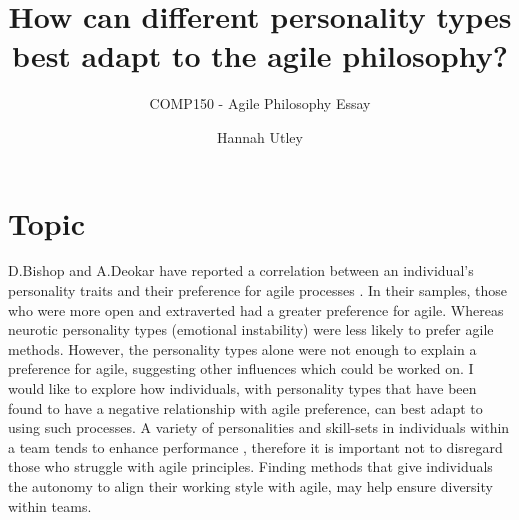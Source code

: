 \documentclass{scrartcl}
\title{How can different personality types best adapt to the agile philosophy?}
\subtitle{COMP150 - Agile Philosophy Essay}
\author{Hannah Utley}
\begin{document}
\maketitle

\section*{Topic}

D.Bishop and A.Deokar have reported a correlation between an individual’s personality traits and their preference for agile processes 
\cite{Paper1}. In their samples, those who were more open and extraverted had a greater preference for agile. Whereas neurotic 
personality types (emotional instability) were less likely to prefer agile methods. However, the personality types alone were not enough 
to explain a preference for agile, suggesting other influences which could be worked on. I would like to explore how individuals, with 
personality types that have been found to have a negative relationship with agile preference, can best adapt to using such processes. A 
variety of personalities and skill-sets in individuals within a team tends to enhance performance \cite{Paper3}, therefore it is 
important not to disregard those who struggle with agile principles. Finding methods that give individuals the autonomy to align their 
working style with agile, may help ensure diversity within teams.
\end{document}
